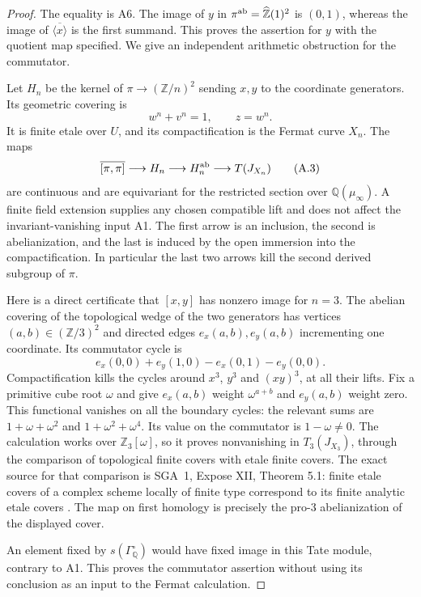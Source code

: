 \begin{proof}
The equality is A6. The image of $y$ in $\pi^{\rm ab}=\widehat{\mathbb Z}(1)^2$ is $(0,1)$, whereas the image of $\overline{\langle x\rangle}$ is the first summand. This proves the assertion for $y$ with the quotient map specified. We give an independent arithmetic obstruction for the commutator.

Let $H_n$ be the kernel of $\pi\to(\mathbb Z/n)^2$ sending $x,y$ to the coordinate generators. Its geometric covering is
\[
 w^n+v^n=1,\qquad z=w^n.
\]
It is finite etale over $U$, and its compactification is the Fermat curve $X_n$. The maps
\[
 \overline{[\pi,\pi]}\longrightarrow H_n\longrightarrow H_n^{\rm ab}
 \longrightarrow T(J_{X_n})
 \tag{A.3}
\]
are continuous and are equivariant for the restricted section over $\mathbb Q(\mu_\infty)$. A finite field extension supplies any chosen compatible lift and does not affect the invariant-vanishing input A1. The first arrow is an inclusion, the second is abelianization, and the last is induced by the open immersion into the compactification. In particular the last two arrows kill the second derived subgroup of $\pi$.

Here is a direct certificate that $[x,y]$ has nonzero image for $n=3$. The abelian covering of the topological wedge of the two generators has vertices $(a,b)\in(\mathbb Z/3)^2$ and directed edges $e_x(a,b),e_y(a,b)$ incrementing one coordinate. Its commutator cycle is
\[
 e_x(0,0)+e_y(1,0)-e_x(0,1)-e_y(0,0).
\]
Compactification kills the cycles around $x^3$, $y^3$ and $(xy)^3$, at all their lifts. Fix a primitive cube root $\omega$ and give $e_x(a,b)$ weight $\omega^{a+b}$ and $e_y(a,b)$ weight zero. This functional vanishes on all the boundary cycles: the relevant sums are $1+\omega+\omega^2$ and $1+\omega^2+\omega^4$. Its value on the commutator is $1-\omega\ne0$. The calculation works over $\mathbb Z_3[\omega]$, so it proves nonvanishing in $T_3(J_{X_3})$, through the comparison of topological finite covers with etale finite covers. The exact source for that comparison is SGA~1, Expose XII, Theorem 5.1: finite etale covers of a complex scheme locally of finite type correspond to its finite analytic etale covers \cite{SGA1}. The map on first homology is precisely the pro-$3$ abelianization of the displayed cover.

An element fixed by $s(\Gamma_{\mathbb Q}^{\circ})$ would have fixed image in this Tate module, contrary to A1. This proves the commutator assertion without using its conclusion as an input to the Fermat calculation.


\end{proof}
